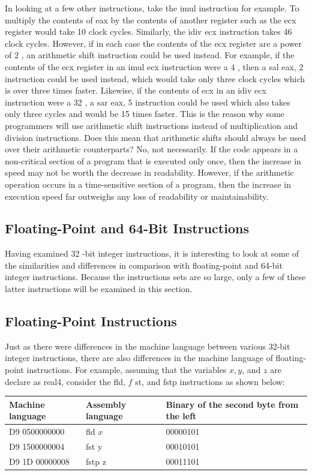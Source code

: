 \documentclass[10pt]{book}
\begin{document}
In looking at a few other instructions, take the imul instruction for example. To multiply the contents of eax by the contents of another register such as the ecx register would take 10 clock cycles. Similarly, the idiv ecx instruction takes 46 clock cycles. However, if in each case the contents of the ecx register are a power of 2 , an arithmetic shift instruction could be used instead. For example, if the contents of the ecx register in an imul ecx instruction were a 4 , then a sal eax, 2 instruction could be used instead, which would take only three clock cycles which is over three times faster. Likewise, if the contents of ecx in an idiv ecx instruction were a 32 , a sar eax, 5 instruction could be used which also takes only three cycles and would be 15 times faster. This is the reason why some programmers will use arithmetic shift instructions instead of multiplication and division instructions. Does this mean that arithmetic shifts should always be used over their arithmetic counterparts? No, not necessarily. If the code appears in a non-critical section of a program that is executed only once, then the increase in speed may not be worth the decrease in readability. However, if the arithmetic operation occurs in a time-sensitive section of a program, then the increase in execution speed far outweighs any loss of readability or maintainability.

\subsection{Floating-Point and 64-Bit Instructions}
Having examined 32 -bit integer instructions, it is interesting to look at some of the similarities and differences in comparison with floating-point and 64-bit integer instructions. Because the instructions sets are so large, only a few of these latter instructions will be examined in this section.

\subsection{Floating-Point Instructions}
Just as there were differences in the machine language between various 32-bit integer instructions, there are also differences in the machine language of floating-point instructions. For example, assuming that the variables $x, y$, and $z$ are declare as real4, consider the fld, $f$ st, and fstp instructions as shown below:
\begin{center}
\begin{tabular}{|l|l|l|}
\hline
Machine language & Assembly language & Binary of the second byte from the left \\
\hline
D9 0500000000 & fld $x$ & 00000101 \\
\hline
D9 1500000004 & fst y & 00010101 \\
\hline
D9 1D 00000008 & fstp z & 00011101 \\
\hline
\end{tabular}
\end{center}
\end{document}
